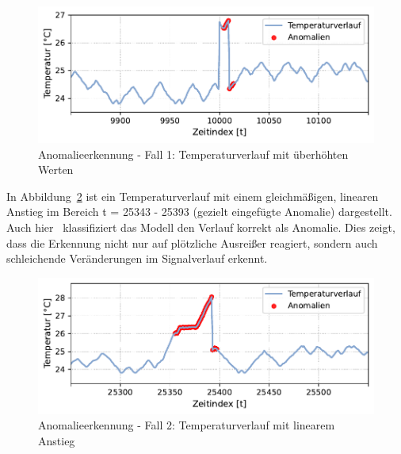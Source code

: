 \vspace{-0.75em}
\begin{figure}[htbp]
    \centering
        \includegraphics[width=1\textwidth]{Bilder/Ergebnisse/KI/Fall1.pdf}
        \vspace{-2em}
    \caption[Anomalieerkennung - Fall 1]{Anomalieerkennung - Fall 1: Temperaturverlauf mit überhöhten Werten}
    \label{fig:Fall1}
\end{figure}
\vspace{-0.75em}

In Abbildung~\ref{fig:Fall2} ist ein Temperaturverlauf mit einem gleichmäßigen, linearen Anstieg im Bereich t = 25343 - 25393 (gezielt eingefügte Anomalie) dargestellt. 
Auch hier%
\pagebreak
~klassifiziert das Modell den Verlauf korrekt als Anomalie. 
Dies zeigt, dass die Erkennung nicht nur auf plötzliche Ausreißer reagiert, sondern auch schleichende Veränderungen im Signalverlauf erkennt.

\vspace{-0.75em}
\begin{figure}[htbp]
    \centering
        \includegraphics[width=1\textwidth]{Bilder/Ergebnisse/KI/Fall2.pdf}
        \vspace{-2em}
    \caption[Anomalieerkennung - Fall 2]{Anomalieerkennung - Fall 2: Temperaturverlauf mit linearem Anstieg}
    \label{fig:Fall2}
\end{figure}
\vspace{-0.75em}

